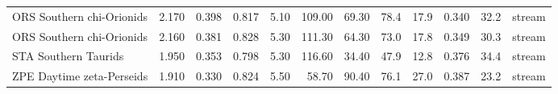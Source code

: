 \begin{tabular}{lrrrrrrrrrrl}
ORS Southern chi-Orionids                    & 2.170 & 0.398 & 0.817 & 5.10 & 109.00 & 69.30 & 78.4 & 17.9 & 0.340 & 32.2 & stream \\
ORS Southern chi-Orionids                    & 2.160 & 0.381 & 0.828 & 5.30 & 111.30 & 64.30 & 73.0 & 17.8 & 0.349 & 30.3 & stream \\
STA Southern Taurids                         & 1.950 & 0.353 & 0.798 & 5.30 & 116.60 & 34.40 & 47.9 & 12.8 & 0.376 & 34.4 & stream \\
ZPE Daytime zeta-Perseids                    & 1.910 & 0.330 & 0.824 & 5.50 & 58.70 & 90.40 & 76.1 & 27.0 & 0.387 & 23.2 & stream \\
\bottomrule
\end{tabular}
